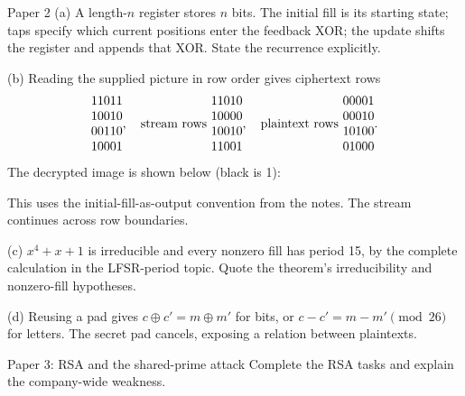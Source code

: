 \documentclass[11pt,a4paper]{article}
\begin{document}
\begin{answer}{Paper 2}
(a) A length-\(n\) register stores \(n\) bits. The initial fill is its starting state; taps specify which current positions enter the feedback XOR; the update shifts the register and appends that XOR. State the recurrence explicitly.

(b) Reading the supplied picture in row order gives ciphertext rows
\[\begin{matrix}11011\\10010\\00110\\10001\end{matrix},\quad\hbox{stream rows }\begin{matrix}11010\\10000\\10010\\11001\end{matrix},\quad\hbox{plaintext rows }\begin{matrix}00001\\00010\\10100\\01000\end{matrix}.\]
The decrypted image is shown below (black is 1):
\begin{center}\end{center}
This uses the initial-fill-as-output convention from the notes. The stream continues across row boundaries.

(c) \(x^4+x+1\) is irreducible and every nonzero fill has period 15, by the complete calculation in the LFSR-period topic. Quote the theorem's irreducibility and nonzero-fill hypotheses.

(d) Reusing a pad gives \(c\oplus c'=m\oplus m'\) for bits, or \(c-c'=m-m'\pmod{26}\) for letters. The secret pad cancels, exposing a relation between plaintexts.
\end{answer}
\begin{question}{Paper 3: RSA and the shared-prime attack}
Complete the RSA tasks and explain the company-wide weakness.
\end{question}
\end{document}
